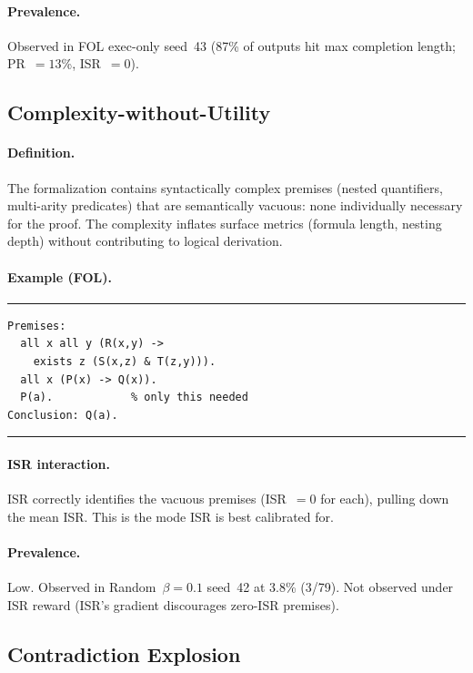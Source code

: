 \paragraph{Prevalence.}
Observed in FOL exec-only seed~43 (87\% of outputs hit max completion length; PR~$=13$\%, ISR~$=0$).


\subsection{Complexity-without-Utility}

\paragraph{Definition.}
The formalization contains syntactically complex premises (nested quantifiers, multi-arity predicates) that are semantically vacuous: none individually necessary for the proof.
The complexity inflates surface metrics (formula length, nesting depth) without contributing to logical derivation.

\paragraph{Example (FOL).}
\smallskip\noindent\rule{\columnwidth}{0.3pt}
{\small\begin{verbatim}
Premises:
  all x all y (R(x,y) ->
    exists z (S(x,z) & T(z,y))).
  all x (P(x) -> Q(x)).
  P(a).            % only this needed
Conclusion: Q(a).
\end{verbatim}}
\noindent\rule{\columnwidth}{0.3pt}\smallskip

\paragraph{ISR interaction.}
ISR correctly identifies the vacuous premises (ISR~$=0$ for each), pulling down the mean ISR.
This is the mode ISR is best calibrated for.

\paragraph{Prevalence.}
Low. Observed in Random~$\beta{=}0.1$ seed~42 at 3.8\% (3/79).
Not observed under ISR reward (ISR's gradient discourages zero-ISR premises).


\subsection{Contradiction Explosion}

